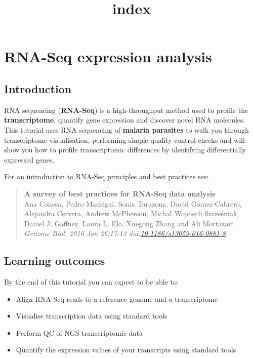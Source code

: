 \documentclass[11pt]{article}
\title{index}
\providecommand{\tightlist}{%
      \setlength{\itemsep}{0pt}\setlength{\parskip}{0pt}}
\begin{document}
    \hypertarget{rna-seq-expression-analysis}{%
\section{RNA-Seq expression
analysis}\label{rna-seq-expression-analysis}}

    \hypertarget{introduction}{%
\subsection{Introduction}\label{introduction}}

RNA sequencing (\textbf{RNA-Seq}) is a high-throughput method used to
profile the \textbf{transcriptome}, quantify gene expression and
discover novel RNA molecules. This tutorial uses RNA sequencing of
\textbf{malaria parasites} to walk you through transcriptome
visualisation, performing simple quality control checks and will show
you how to profile transcriptomic differences by identifying
differentially expressed genes.

    For an introduction to RNA-Seq principles and best practices see:

\begin{quote}
\textbf{A survey of best practices for RNA-Seq data analysis}\\
Ana Conesa, Pedro Madrigal, Sonia Tarazona, David Gomez-Cabrero,
Alejandra Cervera, Andrew McPherson, Michał Wojciech Szcześniak, Daniel
J. Gaffney, Laura L. Elo, Xuegong Zhang and Ali Mortazavi\\
\textit{Genome Biol. 2016 Jan 26;17:13
doi:\href{https://genomebiology.biomedcentral.com/articles/10.1186/s13059-016-0881-8}{10.1186/s13059-016-0881-8}}
\end{quote}

    \hypertarget{learning-outcomes}{%
\subsection{Learning outcomes}\label{learning-outcomes}}

By the end of this tutorial you can expect to be able to:

\begin{itemize}
\tightlist
\item
  Align RNA-Seq reads to a reference genome and a transcriptome
\item
  Visualise transcription data using standard tools
\item
  Perform QC of NGS transcriptomic data
\item
  Quantify the expression values of your transcripts using standard
  tools
\end{itemize}
\end{document}

